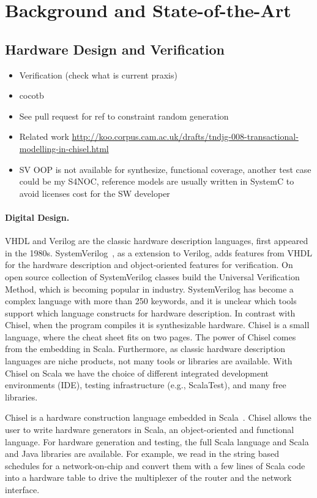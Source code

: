 \documentclass[fleqn,12pt]{article}
\begin{document}
\section{Background and State-of-the-Art}
\label{sec:background}


\subsection{Hardware Design and Verification}

\begin{itemize}
\item Verification (check what is current praxis)
\item cocotb
\item See pull request for ref to constraint random generation
\item Related work \url{http://koo.corpus.cam.ac.uk/drafts/tndjg-008-transactional-modelling-in-chisel.html}
\item SV OOP is not available for synthesize, functional coverage, another test case could be my S4NOC, reference models are usually written in SystemC to avoid licenses cost for the SW developer
\end{itemize}

\paragraph{Digital Design.}
VHDL and Verilog are the classic hardware description languages, first appeared in the 1980s.
SystemVerilog~\cite{SystemVerilog}, as a extension to Verilog, adds features from VHDL
for the hardware description and object-oriented features for verification.
On open source collection of SystemVerilog classes build the Universal Verification Method,
which is becoming popular in industry.
SystemVerilog has become a complex language with more than 250 keywords, and it is unclear
which tools support which language constructs for hardware description.
In contrast with Chisel, when the program compiles it is synthesizable hardware.
Chisel is a small language, where the cheat sheet fits on two pages.
The power of Chisel comes from the embedding in Scala.
Furthermore, as classic hardware description languages are niche products, not
many tools or libraries are available. 
With Chisel on Scala we have the choice of different integrated development environments (IDE),
testing infrastructure (e.g., ScalaTest), and many free libraries.

Chisel is a hardware construction language embedded in Scala~\cite{chisel:dac2012}.
Chisel allows the user to write hardware generators in Scala, an object-oriented and functional language.
For hardware generation and testing, the full Scala language and Scala and Java
libraries are available.
For example, we read in the string based schedules for a network-on-chip
and convert them with a few lines of Scala code into a hardware table to
drive the multiplexer of the router and the network interface.
\end{document}
